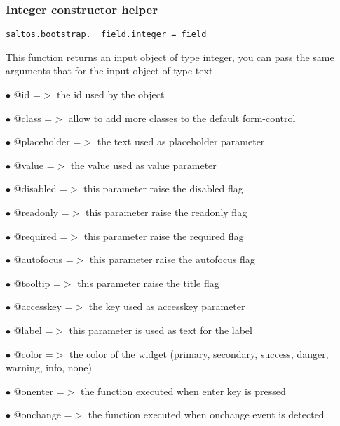 \documentclass[a4paper]{article}
\begin{document}
\hypertarget{toc610}{}
\subsubsection{Integer constructor helper}

\begin{lstlisting}
saltos.bootstrap.__field.integer = field
\end{lstlisting}

This function returns an input object of type integer, you can pass the same arguments
that for the input object of type text

\begin{compactitem}
\item[\color{myblue}$\bullet$] @id          =$>$ the id used by the object
\item[\color{myblue}$\bullet$] @class       =$>$ allow to add more classes to the default form-control
\item[\color{myblue}$\bullet$] @placeholder =$>$ the text used as placeholder parameter
\item[\color{myblue}$\bullet$] @value       =$>$ the value used as value parameter
\item[\color{myblue}$\bullet$] @disabled    =$>$ this parameter raise the disabled flag
\item[\color{myblue}$\bullet$] @readonly    =$>$ this parameter raise the readonly flag
\item[\color{myblue}$\bullet$] @required    =$>$ this parameter raise the required flag
\item[\color{myblue}$\bullet$] @autofocus   =$>$ this parameter raise the autofocus flag
\item[\color{myblue}$\bullet$] @tooltip     =$>$ this parameter raise the title flag
\item[\color{myblue}$\bullet$] @accesskey   =$>$ the key used as accesskey parameter
\item[\color{myblue}$\bullet$] @label       =$>$ this parameter is used as text for the label
\item[\color{myblue}$\bullet$] @color       =$>$ the color of the widget (primary, secondary, success, danger, warning, info, none)
\item[\color{myblue}$\bullet$] @onenter     =$>$ the function executed when enter key is pressed
\item[\color{myblue}$\bullet$] @onchange    =$>$ the function executed when onchange event is detected
\end{compactitem}
\end{document}
